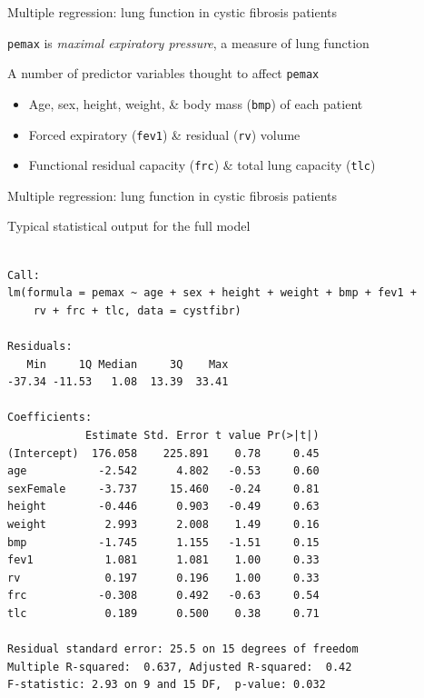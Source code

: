 \documentclass[10pt,ignorenonframetext,compress, aspectratio=169]{beamer}
\providecommand{\tightlist}{%
  \setlength{\itemsep}{0pt}\setlength{\parskip}{0pt}}
\begin{document}
\begin{frame}[fragile]{Multiple regression: lung function in cystic
fibrosis patients}

\texttt{pemax} is \emph{maximal expiratory pressure}, a measure of lung
function

A number of predictor variables thought to affect \texttt{pemax}

\begin{itemize}
\tightlist
\item
  Age, sex, height, weight, \& body mass (\texttt{bmp}) of each patient
\item
  Forced expiratory (\texttt{fev1}) \& residual (\texttt{rv}) volume
\item
  Functional residual capacity (\texttt{frc}) \& total lung capacity
  (\texttt{tlc})
\end{itemize}

\end{frame}

\begin{frame}[fragile]{Multiple regression: lung function in cystic
fibrosis patients}

Typical statistical output for the full model

\tiny

\begin{verbatim}

Call:
lm(formula = pemax ~ age + sex + height + weight + bmp + fev1 + 
    rv + frc + tlc, data = cystfibr)

Residuals:
   Min     1Q Median     3Q    Max 
-37.34 -11.53   1.08  13.39  33.41 

Coefficients:
            Estimate Std. Error t value Pr(>|t|)
(Intercept)  176.058    225.891    0.78     0.45
age           -2.542      4.802   -0.53     0.60
sexFemale     -3.737     15.460   -0.24     0.81
height        -0.446      0.903   -0.49     0.63
weight         2.993      2.008    1.49     0.16
bmp           -1.745      1.155   -1.51     0.15
fev1           1.081      1.081    1.00     0.33
rv             0.197      0.196    1.00     0.33
frc           -0.308      0.492   -0.63     0.54
tlc            0.189      0.500    0.38     0.71

Residual standard error: 25.5 on 15 degrees of freedom
Multiple R-squared:  0.637, Adjusted R-squared:  0.42 
F-statistic: 2.93 on 9 and 15 DF,  p-value: 0.032
\end{verbatim}

\normalsize

\end{frame}
\end{document}
